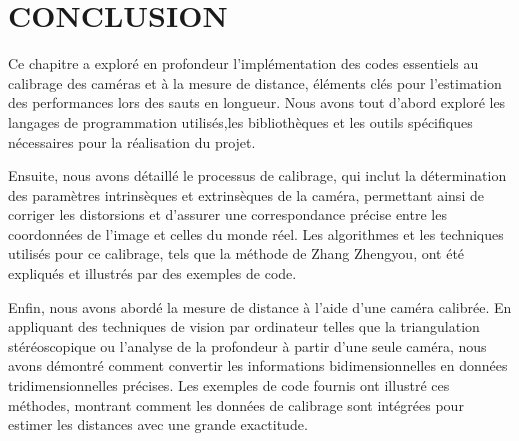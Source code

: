  	
 


 
\section{CONCLUSION}
 
 Ce chapitre a exploré en profondeur l'implémentation des codes essentiels au calibrage des caméras et à la mesure de distance, éléments clés pour l'estimation des performances lors des sauts en longueur. Nous avons tout d'abord exploré les langages de programmation utilisés,les bibliothèques et les outils spécifiques nécessaires pour la réalisation du projet.
 
 Ensuite, nous avons détaillé le processus de calibrage, qui inclut la détermination des paramètres intrinsèques et extrinsèques de la caméra, permettant ainsi de corriger les distorsions et d'assurer une correspondance précise entre les coordonnées de l'image et celles du monde réel. Les algorithmes et les techniques utilisés pour ce calibrage, tels que la méthode de Zhang Zhengyou, ont été expliqués et illustrés par des exemples de code.
 
 Enfin, nous avons abordé la mesure de distance à l'aide d'une caméra calibrée. En appliquant des techniques de vision par ordinateur telles que la triangulation stéréoscopique ou l'analyse de la profondeur à partir d'une seule caméra, nous avons démontré comment convertir les informations bidimensionnelles en données tridimensionnelles précises. Les exemples de code fournis ont illustré ces méthodes, montrant comment les données de calibrage sont intégrées pour estimer les distances avec une grande exactitude.
 
  
